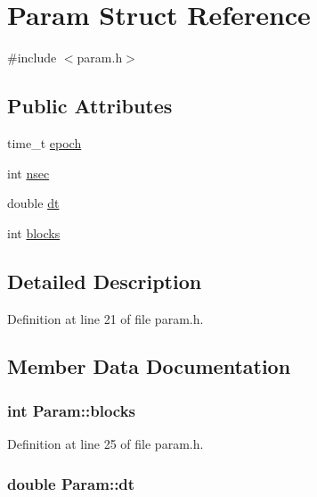 \hypertarget{structParam}{
\section{Param Struct Reference}
\label{structParam}
}


{\ttfamily \#include $<$param.h$>$}\subsection*{Public Attributes}
\begin{DoxyCompactItemize}
\item 
time\_\-t \hyperlink{structParam_a2d1c3d20d5301e6cbfebbaaa6c1aa2b6}{epoch}
\item 
int \hyperlink{structParam_ac93892391ad74849738e22ed6210c746}{nsec}
\item 
double \hyperlink{structParam_a90eeb558478ef46be9d39df8bbbe9440}{dt}
\item 
int \hyperlink{structParam_a5bb6082ad1304fed192919592c17efc4}{blocks}
\end{DoxyCompactItemize}


\subsection{Detailed Description}


Definition at line 21 of file param.h.

\subsection{Member Data Documentation}
\hypertarget{structParam_a5bb6082ad1304fed192919592c17efc4}{
\subsubsection[{blocks}]{\setlength{\rightskip}{0pt plus 5cm}int {\bf Param::blocks}}}
\label{structParam_a5bb6082ad1304fed192919592c17efc4}


Definition at line 25 of file param.h.\hypertarget{structParam_a90eeb558478ef46be9d39df8bbbe9440}{
\subsubsection[{dt}]{\setlength{\rightskip}{0pt plus 5cm}double {\bf Param::dt}}}
\label{structParam_a90eeb558478ef46be9d39df8bbbe9440}



